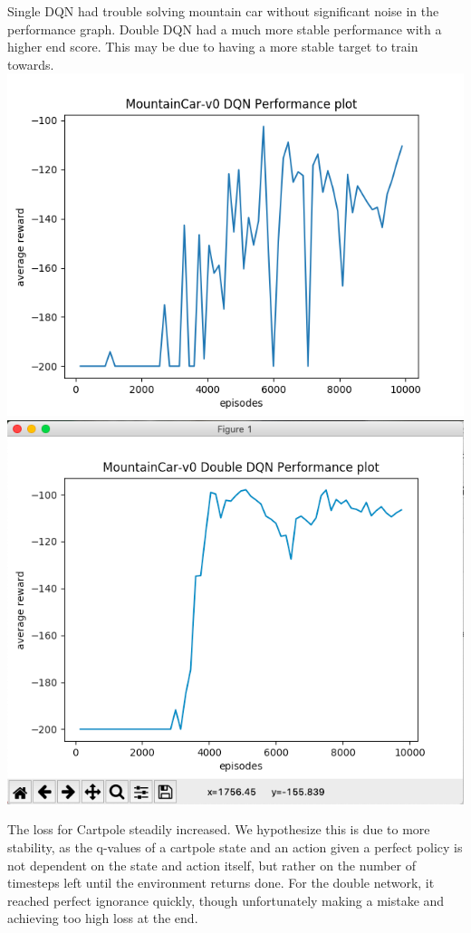 \documentclass[12pt]{article}
\begin{document}
\begin{solution}
Single DQN had trouble solving mountain car without significant noise in the performance graph. Double DQN had a much more stable performance with a higher end score.  This may be due to having a more stable target to train towards.
\includegraphics[scale=0.5]{Completed_Graphs/mountaincar_single_Q.png}\\
\includegraphics[scale=0.37]{Completed_Graphs/Double_DQN_performance_mountaincar.png}

The loss for Cartpole steadily increased. We hypothesize this is due to more stability, as the q-values of a cartpole state and an action given a perfect policy is not dependent on the state and action itself, but rather on the number of timesteps left until the environment returns done. For the double network, it reached perfect ignorance quickly, though unfortunately making a mistake and achieving too high loss at the end. 


\end{solution}
\end{document}
